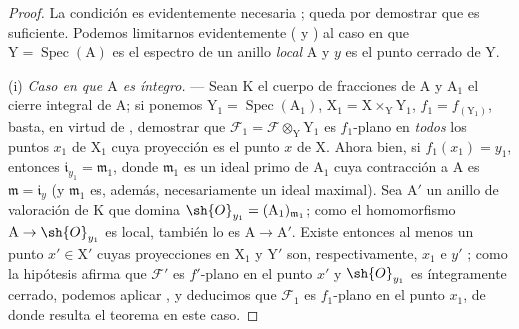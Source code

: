 \begin{proof}
La condición es evidentemente necesaria ; queda por demostrar que es suficiente.
Podemos limitarnos evidentemente ( y ) al caso en que $\mathrm{Y}=\operatorname{Spec}(\mathrm{A})$ es el espectro de un anillo \emph{local} $\mathrm{A}$ y $y$ es el punto cerrado de $\mathrm{Y}$.
\medskip

(i) \emph{Caso en que $\mathrm{A}$ es íntegro.} --- Sean $\mathrm{K}$ el cuerpo de fracciones de $\mathrm{A}$ y $\mathrm{A}_1$ el cierre integral de $\mathrm{A}$; si ponemos $\mathrm{Y}_1=\operatorname{Spec}(\mathrm{A}_1)$, $\mathrm{X}_1=\mathrm{X}\times_\mathrm{Y}\mathrm{Y}_1$, $f_1=f_{(\mathrm{Y}_1)}$, basta, en virtud de , demostrar que $\mathscr{F}_1=\mathscr{F}\otimes_\mathrm{Y}\mathrm{Y}_1$ es $f_1$-plano en \emph{todos} los puntos $x_1$ de $\mathrm{X}_1$ cuya proyección es el punto $x$ de $\mathrm{X}$.
Ahora bien, si $f_1(x_1)=y_1$, entonces $\mathfrak{i}_{y_1}=\mathfrak{m}_1$, donde $\mathfrak{m}_1$ es un ideal primo de $\mathrm{A}_1$ cuya contracción a $\mathrm{A}$ es $\mathfrak{m}=\mathfrak{i}_y$ (y $\mathfrak{m}_1$ es, además, necesariamente un ideal maximal). Sea $\mathrm{A}'$ un anillo de valoración de $\mathrm{K}$ que domina $\sh{O}_{y_1}=(\mathrm{A}_1)_{\mathfrak{m}_1}$; como el homomorfismo $\mathrm{A}\to\sh{O}_{y_1}$ es local, también lo es $\mathrm{A}\to\mathrm{A}'$.
Existe entonces al menos un
punto $x'\in\mathrm{X}'$ cuyas proyecciones en $\mathrm{X}_1$ y $\mathrm{Y}'$ son, respectivamente, $x_1$ e $y'$ ; como la hipótesis afirma que $\mathscr{F}'$ es $f'$-plano en el punto $x'$ y $\sh{O}_{y_1}$ es íntegramente cerrado, podemos aplicar , y deducimos que $\mathscr{F}_1$ es $f_1$-plano en el punto $x_1$, de donde resulta el teorema en este caso.
\medskip


\end{proof}
